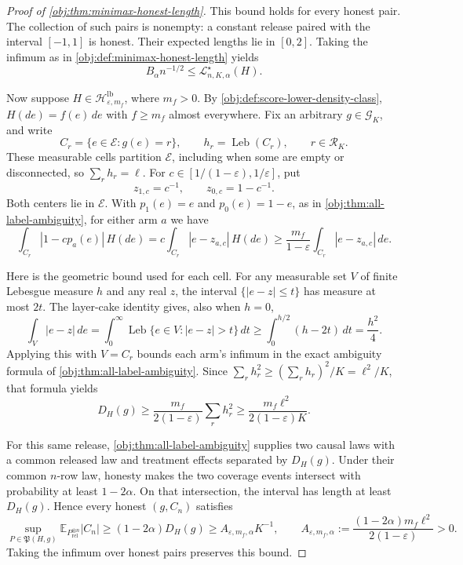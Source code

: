 \documentclass[11pt]{article}
\begin{document}
\begin{proof}[Proof of \cref{obj:thm:minimax-honest-length}]
This bound holds for every honest pair. The collection of such pairs is nonempty: a constant release paired with the interval \([-1,1]\) is honest. Their expected lengths lie in \([0,2]\). Taking the infimum as in \cref{obj:def:minimax-honest-length} yields
\[
B_\alpha n^{-1/2}\leq\mathcal L^\star_{n,K,\alpha}(H).
\]

Now suppose \(H\in\mathcal H^{\mathrm{lb}}_{\varepsilon,m_f}\), where \(m_f>0\). By \cref{obj:def:score-lower-density-class}, \(H(de)=f(e)\,de\) with \(f\geq m_f\) almost everywhere. Fix an arbitrary \(g\in\mathcal G_K\), and write
\[
C_r=\{e\in\mathcal E:g(e)=r\},\qquad
h_r=\operatorname{Leb}(C_r),\qquad r\in\mathcal R_K.
\]
These measurable cells partition \(\mathcal E\), including when some are empty or disconnected, so \(\sum_rh_r=\ell\). For \(c\in[1/(1-\varepsilon),1/\varepsilon]\), put
\[
z_{1,c}=c^{-1},\qquad z_{0,c}=1-c^{-1}.
\]
Both centers lie in \(\mathcal E\). With \(p_1(e)=e\) and \(p_0(e)=1-e\), as in \cref{obj:thm:all-label-ambiguity}, for either arm \(a\) we have
\[
\int_{C_r}|1-cp_a(e)|\,H(de)
=c\int_{C_r}|e-z_{a,c}|\,H(de)
\geq\frac{m_f}{1-\varepsilon}
       \int_{C_r}|e-z_{a,c}|\,de.
\]

Here is the geometric bound used for each cell. For any measurable set \(V\) of finite Lebesgue measure \(h\) and any real \(z\), the interval \(\{|e-z|\leq t\}\) has measure at most \(2t\). The layer-cake identity gives, also when \(h=0\),
\[
\int_V|e-z|\,de
=\int_0^\infty\operatorname{Leb}\{e\in V:|e-z|>t\}\,dt
\geq\int_0^{h/2}(h-2t)\,dt
=\frac{h^2}{4}.
\]
Applying this with \(V=C_r\) bounds each arm’s infimum in the exact ambiguity formula of \cref{obj:thm:all-label-ambiguity}. Since \(\sum_rh_r^2\geq(\sum_rh_r)^2/K=\ell^2/K\), that formula yields
\[
D_H(g)\geq
\frac{m_f}{2(1-\varepsilon)}\sum_r h_r^2
\geq\frac{m_f\ell^2}{2(1-\varepsilon)K}.
\]

For this same release, \cref{obj:thm:all-label-ambiguity} supplies two causal laws with a common released law and treatment effects separated by \(D_H(g)\). Under their common \(n\)-row law, honesty makes the two coverage events intersect with probability at least \(1-2\alpha\). On that intersection, the interval has length at least \(D_H(g)\). Hence every honest \((g,C_n)\) satisfies
\[
\sup_{P\in\mathfrak P(H,g)}
\mathbb E_{P_{\mathrm{rel}}^{\otimes n}}|C_n|
\geq(1-2\alpha)D_H(g)
\geq A_{\varepsilon,m_f,\alpha}K^{-1},
\qquad
A_{\varepsilon,m_f,\alpha}
:=\frac{(1-2\alpha)m_f\ell^2}{2(1-\varepsilon)}>0.
\]
Taking the infimum over honest pairs preserves this bound. %


\end{proof}
\end{document}
